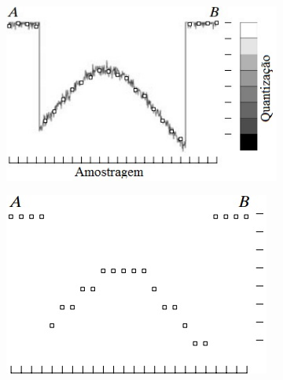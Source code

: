 \begin{figure}[htb]
\begin{center}
  \begin{subfigure}[b]{0.4\textwidth}
  \centering
      \includegraphics[scale=0.4]{images/sampling/sampling.jpg}
    \caption{}
    \label{sampling}
  \end{subfigure}
  \begin{subfigure}[b]{0.4\textwidth}
  \centering
    \includegraphics[scale=0.4]{images/sampling/quant.jpg}
    \caption{}
    \label{quant}
  \end{subfigure}
  \label{sq}
\end{center}

\end{figure}

